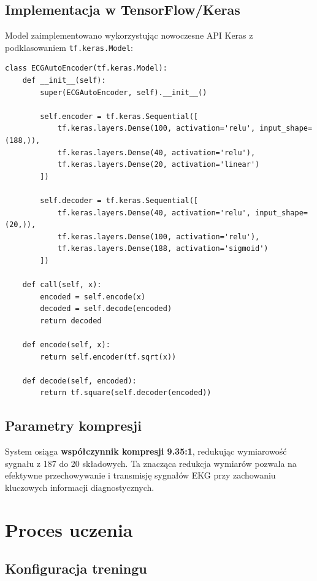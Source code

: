 \documentclass[12pt,a4paper]{article}
\begin{document}
\subsection{Implementacja w TensorFlow/Keras}

Model zaimplementowano wykorzystując nowoczesne API Keras z podklasowaniem \texttt{tf.keras.Model}:

\begin{lstlisting}[caption=Implementacja klasy ECGAutoEncoder]
class ECGAutoEncoder(tf.keras.Model):
    def __init__(self):
        super(ECGAutoEncoder, self).__init__()
        
        self.encoder = tf.keras.Sequential([
            tf.keras.layers.Dense(100, activation='relu', input_shape=(188,)),
            tf.keras.layers.Dense(40, activation='relu'),
            tf.keras.layers.Dense(20, activation='linear')
        ])
        
        self.decoder = tf.keras.Sequential([
            tf.keras.layers.Dense(40, activation='relu', input_shape=(20,)),
            tf.keras.layers.Dense(100, activation='relu'),
            tf.keras.layers.Dense(188, activation='sigmoid')
        ])
    
    def call(self, x):
        encoded = self.encode(x)
        decoded = self.decode(encoded)
        return decoded
    
    def encode(self, x):
        return self.encoder(tf.sqrt(x))
    
    def decode(self, encoded):
        return tf.square(self.decoder(encoded))
\end{lstlisting}

\subsection{Parametry kompresji}

System osiąga \textbf{współczynnik kompresji 9.35:1}, redukując wymiarowość sygnału z 187 do 20 składowych. Ta znacząca redukcja wymiarów pozwala na efektywne przechowywanie i transmisję sygnałów EKG przy zachowaniu kluczowych informacji diagnostycznych.

\section{Proces uczenia}

\subsection{Konfiguracja treningu}
\end{document}
